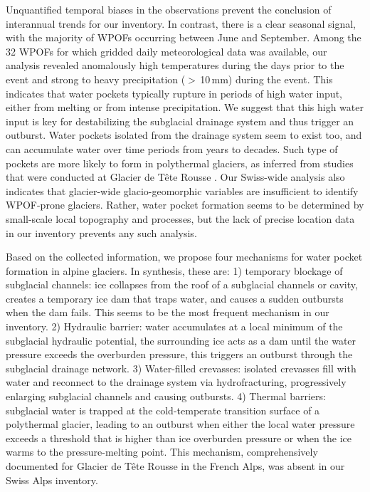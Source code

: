 Unquantified temporal biases in the observations prevent the conclusion of interannual trends for our inventory. In contrast, there is a clear seasonal signal, with the majority of WPOFs occurring between June and September. Among the 32 WPOFs for which gridded daily meteorological data was available, our analysis revealed anomalously high temperatures during the days prior to the event and strong to heavy precipitation ($>$\,10\,mm) during the event. This indicates that water pockets typically rupture in periods of high water input, either from melting or from intense precipitation. We suggest that this high water input is key for destabilizing the subglacial drainage system and thus trigger an outburst. Water pockets isolated from the drainage system seem to exist too, and can accumulate water over time periods from years to decades. Such type of pockets are more likely to form in polythermal glaciers, as inferred from studies that were conducted at Glacier de Tête Rousse \citep{Gilbert&al2012, Gilbert&al2015}. Our Swiss-wide analysis also indicates that glacier-wide glacio-geomorphic variables are insufficient to identify WPOF-prone glaciers. Rather, water pocket formation seems to be determined by small-scale local topography and processes, but the lack of precise location data in our inventory prevents any such analysis.

Based on the collected information, we propose four mechanisms for water pocket formation in alpine glaciers. In synthesis, these are: 1) temporary blockage of subglacial channels: ice collapses from the roof of a subglacial channels or cavity, creates a temporary ice dam that traps water, and causes a sudden outbursts when the dam fails. This seems to be the most frequent mechanism in our inventory. 2) Hydraulic barrier: water accumulates at a local minimum of the subglacial hydraulic potential, the surrounding ice acts as a dam until the water pressure exceeds the overburden pressure, this triggers an outburst through the subglacial drainage network. 3) Water-filled crevasses: isolated crevasses fill with water and reconnect to the drainage system via hydrofracturing, progressively enlarging subglacial channels and causing outbursts. 4) Thermal barriers: subglacial water is trapped at the cold-temperate transition surface of a polythermal glacier, leading to an outburst when either the local water pressure exceeds a threshold that is higher than ice overburden pressure or when the ice warms to the pressure-melting point. This mechanism, comprehensively documented for Glacier de Tête Rousse in the French Alps, was absent in our Swiss Alps inventory.

